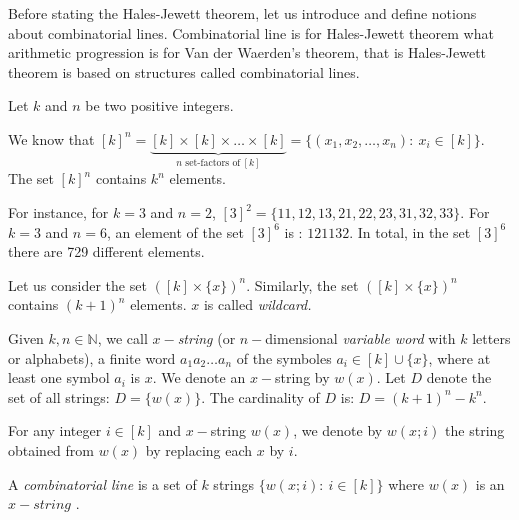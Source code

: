 Before stating the Hales-Jewett theorem, let us introduce and define notions about combinatorial lines.  Combinatorial line is for Hales-Jewett theorem what arithmetic progression is for Van der Waerden's theorem, that is Hales-Jewett theorem is based on structures called combinatorial lines.

Let $k$ and $n$  be two positive integers. 

We know that $[k]^n= \underbrace{[k] \times [k] \times \ldots \times [k]}_{n \text{ set-factors  of}\  [k]}=\{(x_1,x_2,\ldots, x_n):\ x_i \in [k] \}.$ The set $[k]^n$ contains $k^n$ elements.

For instance, for $k=3$ and $n=2$, $[3]^2=\{11,12,13,21,22,23,31,32,33\}.$ For $k=3$ and $n=6$, an element of the set $[3]^6$ is : $121132.$ In total, in the set $[3]^6$ there are  729 different elements.

Let us consider the set $([k]\times \{x\})^n.$ Similarly, the set $([k]\times \{x\})^n$ contains $(k+1)^n$ elements. $x$ is called \textit{wildcard.}



Given ${k,n\in{\mathbb N}}$, we call $x-$\textit{string} (or ${n}-$dimensional \textit{variable word} with ${k}$ letters or alphabets),  a finite word $a_1a_2\ldots a_n$ of the symboles
$a_i \in [k] \cup \{x\}$, where at least one symbol $a_i$ is $x.$ We denote an $x-$string by $w(x)$. Let $D$ denote  the set of all strings: $D=\{w(x)\}$. The cardinality of $D$ is: $D=(k+1)^n-k^n.$ 

For any integer $i \in [k]$ and $x-$string $w(x)$, we  denote by $w(x;i)$ the string obtained from $w(x)$ by replacing each $x$ by $i.$
 \begin{defn}
A \textit{combinatorial line} is a set of $k$ strings $\{w(x;i): \  i\in [k] \}$ where $w(x)$ is an $x-string$ %
.\end{defn}

